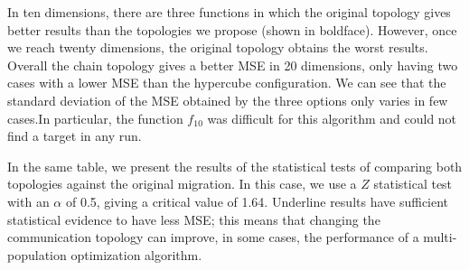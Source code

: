 \documentclass[runningheads]{llncs}
\begin{document}
In ten dimensions, there are three functions in which the original topology
gives better results than the topologies we propose (shown in boldface).
However, once we reach twenty dimensions, the original topology obtains the
worst results. Overall the chain topology gives a better MSE in 20 dimensions,
only having two cases with a lower MSE than the hypercube configuration. We can
see that the standard deviation of the MSE obtained by the three options only
varies in few cases.In particular, the function $f_{10}$ was difficult for this
algorithm and could not find a target in any run.  

In the same table, we present the results of the statistical tests of comparing
both topologies against the original migration. In this case, we use a \(Z\)
statistical test with an $\alpha$ of 0.5, giving a critical value of 1.64.
Underline results have sufficient statistical evidence to have less MSE; this
means that changing the communication topology can improve, in some cases, the
performance of a multi-population optimization algorithm.


\end{document}
